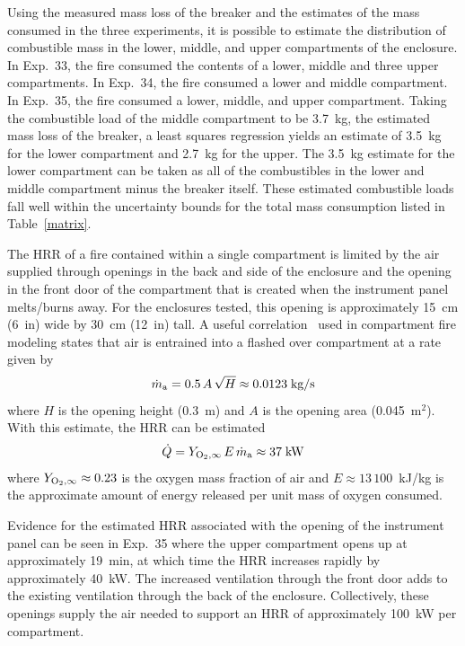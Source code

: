 Using the measured mass loss of the breaker and the estimates of the mass consumed in the three experiments, it is possible to estimate the distribution of combustible mass in the lower, middle, and upper compartments of the enclosure. In Exp.~33, the fire consumed the contents of a lower, middle and three upper compartments. In Exp.~34, the fire consumed a lower and middle compartment. In Exp.~35, the fire consumed a lower, middle, and upper compartment. Taking the combustible load of the middle compartment to be 3.7~kg, the estimated mass loss of the breaker, a least squares regression yields an estimate of 3.5~kg for the lower compartment and 2.7~kg for the upper. The 3.5~kg estimate for the lower compartment can be taken as all of the combustibles in the lower and middle compartment minus the breaker itself. These estimated combustible loads fall well within the uncertainty bounds for the total mass consumption listed in Table~\ref{matrix}.

The HRR of a fire contained within a single compartment is limited by the air supplied through openings in the back and side of the enclosure and the opening in the front door of the compartment that is created when the instrument panel melts/burns away. For the enclosures tested, this opening is approximately 15~cm (6~in) wide by 30~cm (12~in) tall. A useful correlation~\cite{SFPE:Walton} used in compartment fire modeling states that air is entrained into a flashed over compartment at a rate given by
\begin{equation}
   \dot{m}_{\rm a} = 0.5  \, A \, \sqrt{H}  \approx 0.0123 \; \hbox{kg/s}
\end{equation}
where $H$ is the opening height (0.3~m) and $A$ is the opening area (0.045~m$^2$). With this estimate, the HRR can be estimated
\begin{equation}
   \dot{Q} = Y_{\rm O_2,\infty} \, E \, \dot{m}_{\rm a} \approx 37 \; \hbox{kW}
\end{equation}
where $Y_{\rm O_2,\infty}\approx 0.23$ is the oxygen mass fraction of air and $E\approx 13\,100$~kJ/kg is the approximate amount of energy released per unit mass of oxygen consumed.

Evidence for the estimated HRR associated with the opening of the instrument panel can be seen in Exp.~35 where the upper compartment opens up at approximately 19~min, at which time the HRR increases rapidly by approximately 40~kW. The increased ventilation through the front door adds to the existing ventilation through the back of the enclosure. Collectively, these openings supply the air needed to support an HRR of approximately 100~kW per compartment.


